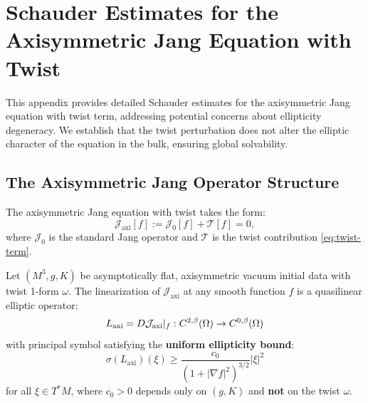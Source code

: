 \section{Schauder Estimates for the Axisymmetric Jang Equation with Twist}\label{app:schauder}

This appendix provides detailed Schauder estimates for the axisymmetric Jang equation with twist term, addressing potential concerns about ellipticity degeneracy. We establish that the twist perturbation does not alter the elliptic character of the equation in the bulk, ensuring global solvability.

\subsection{The Axisymmetric Jang Operator Structure}

The axisymmetric Jang equation with twist takes the form:
\begin{equation}\label{eq:axi-jang-full}
\mathcal{J}_{\mathrm{axi}}[f] := \mathcal{J}_0[f] + \mathcal{T}[f] = 0,
\end{equation}
where $\mathcal{J}_0$ is the standard Jang operator and $\mathcal{T}$ is the twist contribution \eqref{eq:twist-term}.

\begin{proposition}\label{prop:ellipticity-nondegen}
Let $(M^3, g, K)$ be asymptotically flat, axisymmetric vacuum initial data with twist 1-form $\omega$. The linearization of $\mathcal{J}_{\mathrm{axi}}$ at any smooth function $f$ is a quasilinear elliptic operator:
\[
L_{\mathrm{axi}} = D\mathcal{J}_{\mathrm{axi}}|_f : C^{2,\beta}(\Omega) \to C^{0,\beta}(\Omega)
\]
with principal symbol satisfying the \textbf{uniform ellipticity bound}:
\begin{equation}\label{eq:uniform-ellipticity}
\sigma(L_{\mathrm{axi}})(\xi) \geq \frac{c_0}{(1 + |\nabla f|^2)^{3/2}} |\xi|^2
\end{equation}
for all $\xi \in T^*M$, where $c_0 > 0$ depends only on $(g, K)$ and \textbf{not} on the twist $\omega$.
\end{proposition}

